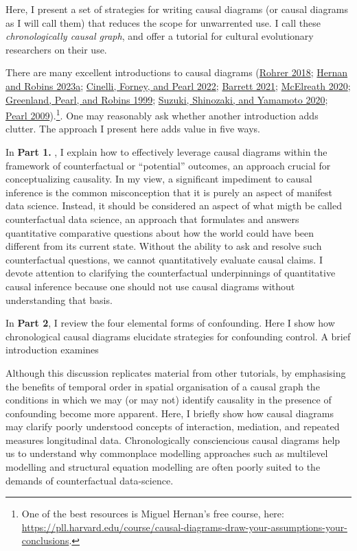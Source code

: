\documentclass[
  singlecolumn]{report}
\begin{document}
Here, I present a set of strategies for writing causal diagrams (or
causal diagrams as I will call them) that reduces the scope for
unwarrented use. I call these \emph{chronologically causal graph}, and
offer a tutorial for cultural evolutionary researchers on their use.

There are many excellent introductions to causal diagrams
(\protect\hyperlink{ref-rohrer2018}{Rohrer 2018};
\protect\hyperlink{ref-hernan2023}{Hernan and Robins 2023a};
\protect\hyperlink{ref-cinelli2022}{Cinelli, Forney, and Pearl 2022};
\protect\hyperlink{ref-barrett2021}{Barrett 2021};
\protect\hyperlink{ref-mcelreath2020}{McElreath 2020};
\protect\hyperlink{ref-greenland1999}{Greenland, Pearl, and Robins
1999}; \protect\hyperlink{ref-suzuki2020}{Suzuki, Shinozaki, and
Yamamoto 2020}; \protect\hyperlink{ref-pearl2009}{Pearl
2009}).\footnote{One of the best resources is Miguel Hernan's free
  course, here:
  \url{https://pll.harvard.edu/course/causal-diagrams-draw-your-assumptions-your-conclusions}.}.
One may reasonably ask whether another introduction adds clutter. The
approach I present here adds value in five ways.

In \textbf{Part 1.} , I explain how to effectively leverage causal
diagrams within the framework of counterfactual or ``potential''
outcomes, an approach crucial for conceptualizing causality. In my view,
a significant impediment to causal inference is the common misconception
that it is purely an aspect of manifest data science. Instead, it should
be considered an aspect of what migth be called counterfactual data
science, an approach that formulates and answers quantitative
comparative questions about how the world could have been different from
its current state. Without the ability to ask and resolve such
counterfactual questions, we cannot quantitatively evaluate causal
claims. I devote attention to clarifying the counterfactual
underpinnings of quantitative causal inference because one should not
use causal diagrams without understanding that basis.

In \textbf{Part 2}, I review the four elemental forms of confounding.
Here I show how chronological causal diagrams elucidate strategies for
confounding control. A brief introduction examines

Although this discussion replicates material from other tutorials, by
emphasising the benefits of temporal order in spatial organisation of a
causal graph the conditions in which we may (or may not) identify
causality in the presence of confounding become more apparent. Here, I
briefly show how causal diagrams may clarify poorly understood concepts
of interaction, mediation, and repeated measures longitudinal data.
Chronologically consciencious causal diagrams help us to understand why
commonplace modelling approaches such as multilevel modelling and
structural equation modelling are often poorly suited to the demands of
counterfactual data-science.
\end{document}
